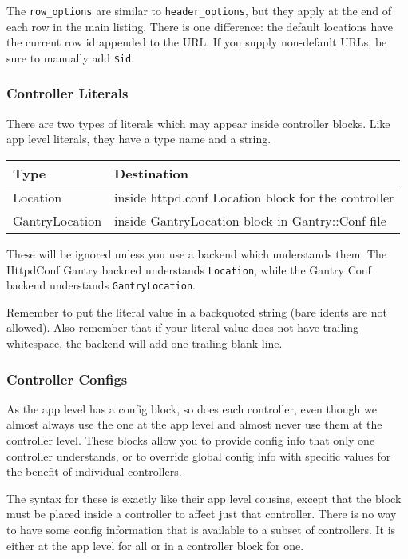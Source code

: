 The \verb+row_options+ are similar to \verb+header_options+, but they
apply at the end of each row in the main listing.  There is one difference:
the default locations have the current row id appended to the URL.
If you supply non-default URLs, be sure to manually add \verb+$id+.

\subsubsection*{Controller Literals}

There are two types of literals which may appear inside controller blocks.
Like app level literals, they have a type name and a string.

\begin{tabular}{l|l}
Type & Destination \\
\hline
Location & inside httpd.conf Location block for the controller \\
GantryLocation & inside GantryLocation block in Gantry::Conf file \\
\end{tabular}

These will be ignored unless you use a backend which understands them.
The HttpdConf Gantry backned understands \verb+Location+, while
the Gantry Conf backend understands \verb+GantryLocation+.

Remember to put the literal value in a backquoted string (bare idents
are not allowed).  Also remember that if your literal value does not
have trailing whitespace, the backend will add one trailing blank line.

\subsubsection*{Controller Configs}

As the app level has a config block, so does each controller, even though
we almost always use the one at the app level and almost never use them
at the controller level.  These blocks allow you to provide config info
that only one controller understands, or to override global config info
with specific values for the benefit of individual controllers.

The syntax for these is exactly like their app level cousins, except that
the block must be placed inside a controller to affect just that controller.
There is no way to have some config information that is available to
a subset of controllers.  It is either at the app level for all or in
a controller block for one.

